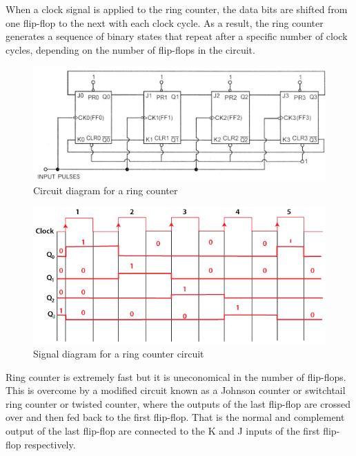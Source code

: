 When a clock signal is applied to the ring counter, the data bits are shifted from one flip-flop to the next with each clock cycle. As a result, the ring counter generates a sequence of binary states that repeat after a specific number of clock cycles, depending on the number of flip-flops in the circuit. 

\begin{figure}[H]
    \centering
    \includegraphics[width=1\columnwidth]{images/ring.png}
    \caption{Circuit diagram for a ring counter}
    \label{ring}
\end{figure}

\begin{figure}[H]
    \centering
    \includegraphics[width=1\columnwidth]{images/ring-counter5.png}
    \caption{Signal diagram for a ring counter circuit}
\end{figure}

Ring counter is extremely fast but it is uneconomical in the number of flip-flops.
This is overcome by a modified circuit known as a Johnson counter or switchtail ring
counter or twisted counter, where the outputs of the last flip-flop are crossed over and
then fed back to the first flip-flop. That is the normal and complement output of the last
flip-flop are connected to the K and J inputs of the first flip-flop respectively.

